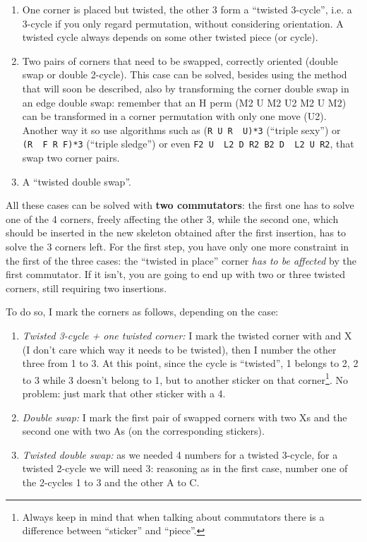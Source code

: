 \documentclass[11pt,a4paper]{book}
\newcommand{\p}{\textquotesingle}
\newcommand{\m}{\texttt}
\newcommand{\ps}{\p\,\,}
\begin{document}
\begin{enumerate}
\item One corner is placed but twisted, the other 3 form a ``twisted 3-cycle'', i.e. a 3-cycle if you only regard permutation, without considering orientation. A twisted cycle always depends on some other twisted piece (or cycle).
\item Two pairs of corners that need to be swapped, correctly oriented (double swap or double 2-cycle). This case can be solved, besides using the method that will soon be described, also by transforming the corner double swap in an edge double swap: remember that an H perm (M2 U M2 U2 M2 U M2) can be transformed in a corner permutation with only one move (U2). Another way it so use algorithms such as (\m{R U R\ps U\p)*3} (``triple sexy'') or \m{(R\ps F R F\p)*3} (``triple sledge'') or even \m{F2 U\ps L2 D R2 B2 D\ps L2 U R2}, that swap two corner pairs.
\item A ``twisted double swap''.
\end{enumerate}

All these cases can be solved with \textbf{two commutators}: the first one has to solve one of the 4 corners, freely affecting the other 3, while the second one, which should be inserted in the new skeleton obtained after the first insertion, has to solve the 3 corners left. For the first step, you have only one more constraint in the first of the three cases: the ``twisted in place'' corner \emph{has to be affected} by the first commutator. If it isn't, you are going to end up with two or three twisted corners, still requiring two insertions.

To do so, I mark the corners as follows, depending on the case:
\begin{enumerate}
\item \emph{Twisted 3-cycle + one twisted corner:} I mark the twisted corner with and X (I don't care which way it needs to be twisted), then I number the other three from 1 to 3. At this point, since the cycle is ``twisted'', 1 belongs to 2, 2 to 3 while 3 doesn't belong to 1, but to another sticker on that corner\footnote{Always keep in mind that when talking about commutators there is a difference between ``sticker'' and ``piece''.}. No problem: just mark that other sticker with a 4.
\item \emph{Double swap:} I mark the first pair of swapped corners with two Xs and the second one with two As (on the corresponding stickers).
\item \emph{Twisted double swap:} as we needed 4 numbers for a twisted 3-cycle, for a twisted 2-cycle we will need 3: reasoning as in the first case, number one of the 2-cycles 1 to 3 and the other A to C.
\end{enumerate}
\end{document}
